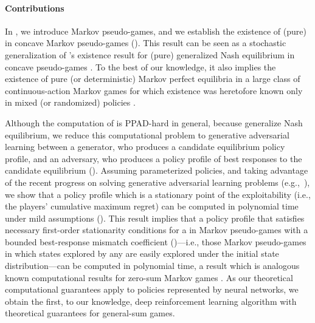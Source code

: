 \paragraph{Contributions}


In , we introduce Markov pseudo-games, 
and we establish the existence of (pure)  in 
concave Markov pseudo-games (). 
This result can be seen as a stochastic generalization of \citet{arrow-debreu}'s existence result for (pure) generalized Nash equilibrium in concave pseudo-games \cite{facchinei2010generalized}.
To the best of our knowledge, it also implies the existence of pure (or deterministic) Markov perfect equilibria in a large class of continuous-action Markov games for which existence was heretofore known only in mixed (or randomized) policies \cite{fink1964equilibrium, takahashi1964equilibrium}.

Although the computation of \MPGNE{} is PPAD-hard in general, because \MPGNE{} generalize Nash equilibrium, we reduce this computational problem to generative adversarial learning between a generator, who produces a candidate equilibrium policy profile, and an adversary, who produces a policy profile of best responses to the candidate equilibrium \cite{goktas2023generative} ().
Assuming parameterized policies, and taking advantage of the recent progress on solving generative adversarial learning problems (e.g.,~\cite{lin2020gradient, daskalakis2020independent}), we show that a policy profile which is a stationary point of the exploitability (i.e., the players’ cumulative maximum regret) can be computed in polynomial time under mild assumptions (). 
This result implies that a policy profile that satisfies necessary first-order stationarity conditions for a \mpgne{} in Markov pseudo-games with a bounded best-response mismatch coefficient ()---i.e., those Markov pseudo-games in which states explored by any \mpgne{} are easily explored under the initial state distribution---can be computed in polynomial time, a result which is analogous known computational results for zero-sum Markov games \cite{daskalakis2020independent}.
As our theoretical computational guarantees apply to policies represented by neural networks, we obtain the first, to our knowledge, deep reinforcement learning algorithm with theoretical guarantees for general-sum games.

